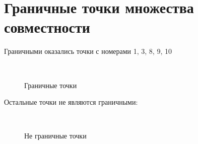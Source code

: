 \documentclass[a4paper,12pt]{article}
\begin{document}
\newpage
\section{Граничные точки множества совместности}

Граничными оказались точки с номерами 1, 3, 8, 9, 10

\begin{figure}[h!]~\label{fig8}
\begin{minipage}[H]{0.45\linewidth}
\end{minipage}
\hfill
\begin{minipage}[H]{0.45\linewidth}
\end{minipage}
\hfill
\begin{minipage}[H]{0.45\linewidth}
\end{minipage}
\hfill
\begin{minipage}[H]{0.45\linewidth}
\end{minipage}
\hfill
\begin{minipage}[H]{0.45\linewidth}
\end{minipage}
\caption{Граничные точки}
\end{figure} 

\pagebreak

Остальные точки не являются граничными:

\begin{figure}[h!]~\label{fig9}
\begin{minipage}[H]{0.45\linewidth}
\end{minipage}
\hfill
\begin{minipage}[H]{0.45\linewidth}
\end{minipage}
\hfill
\begin{minipage}[H]{0.45\linewidth}
\end{minipage}
\hfill
\begin{minipage}[H]{0.45\linewidth}
\end{minipage}
\hfill
\begin{minipage}[H]{0.45\linewidth}
\end{minipage}
\caption{Не граничные точки}
\end{figure}
\end{document}
